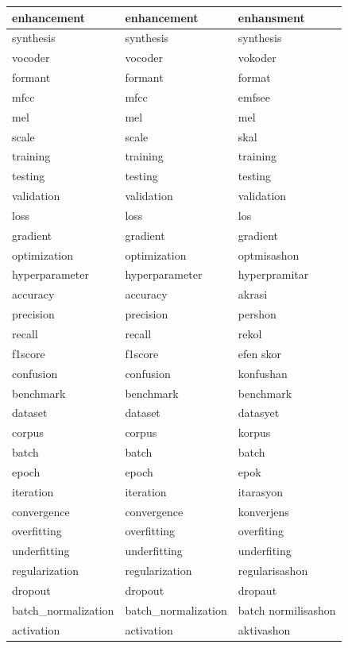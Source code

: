 \documentclass[10pt,twocolumn,letterpaper]{article}
\begin{document}
\begin{longtable}{|p{4cm}|p{4cm}|p{4cm}|}
enhancement & enhancement & enhansment \\ \hline
synthesis & synthesis & synthesis \\ \hline
vocoder & vocoder & vokoder \\ \hline
formant & formant & format \\ \hline
mfcc & mfcc & emfsee \\ \hline
mel & mel & mel \\ \hline
scale & scale & skal \\ \hline
training & training & training \\ \hline
testing & testing & testing \\ \hline
validation & validation & validation \\ \hline
loss & loss & los \\ \hline
gradient & gradient & gradient \\ \hline
optimization & optimization & optmisashon \\ \hline
hyperparameter & hyperparameter & hyperpramitar \\ \hline
accuracy & accuracy & akrasi \\ \hline
precision & precision & pershon \\ \hline
recall & recall & rekol \\ \hline
f1score & f1score & efen skor \\ \hline
confusion & confusion & konfushan \\ \hline
benchmark & benchmark & benchmark \\ \hline
dataset & dataset & datasyet \\ \hline
corpus & corpus & korpus \\ \hline
batch & batch & batch \\ \hline
epoch & epoch & epok \\ \hline
iteration & iteration & itarasyon \\ \hline
convergence & convergence & konverjens \\ \hline
overfitting & overfitting & overfiting \\ \hline
underfitting & underfitting & underfiting \\ \hline
regularization & regularization & regularisashon \\ \hline
dropout & dropout & dropaut \\ \hline
batch\_normalization & batch\_normalization & batch normilisashon \\ \hline
activation & activation & aktivashon \\ \hline

\end{longtable}
\end{document}
